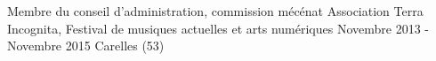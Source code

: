 

\begin{cventries}

  \cventry
    {Membre du conseil d'administration, commission mécénat} %
    {Association Terra Incognita, Festival de musiques actuelles et arts numériques} %
    {Novembre 2013 - Novembre 2015} %
    {Carelles (53)} %
    {
      \begin{cvitems} 
      \end{cvitems}
    }

\end{cventries}
